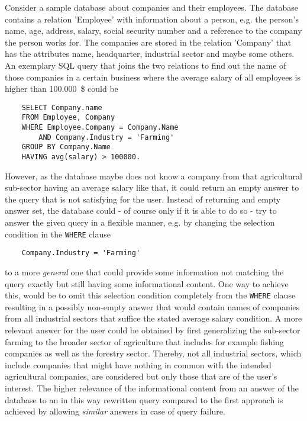 \begin{exmp}
\label{sec:intro_exmp}
Consider a sample database about companies and their employees. The database contains a relation 'Employee' with information about a person, e.g. the
person's name, age, address, salary, social security number and a reference to the company the person works for. The companies are stored in the
relation 'Company' that has the attributes name, headquarter, industrial sector and maybe some others. An exemplary SQL query that joins the two relations
to find out the name of those companies in a certain business where the average salary of all employees is higher than 100.000~\$ could be
\begin{verbatim}
    SELECT Company.name 
    FROM Employee, Company 
    WHERE Employee.Company = Company.Name 
        AND Company.Industry = 'Farming'
    GROUP BY Company.Name 
    HAVING avg(salary) > 100000.
\end{verbatim}
However, as the database maybe does not know a company from that agricultural sub-sector having an average salary like that, it could return an empty 
answer to the query that is not satisfying for the user. Instead of returning and empty answer set, the database could - of course only if it is able 
to do so - try to answer the given query in a flexible manner, e.g. by changing the selection condition in the \verb!WHERE! clause
\begin{verbatim}
    Company.Industry = 'Farming'
\end{verbatim}
to a more \emph{general} one that could provide some information not matching the query exactly but still having some informational content. One way to 
achieve this, would be to omit this selection condition completely from the \verb!WHERE! clause resulting in a possibly non-empty answer that would 
contain names of companies from all industrial sectors that suffice the stated average salary condition. A more relevant answer for the user could be
obtained by first generalizing the sub-sector farming to the broader sector of agriculture that includes for example fishing companies as well as the
forestry sector. Thereby, not all industrial sectors, which include companies that might have nothing in common with the intended agricultural companies,
are considered but only those that are of the user's interest. The higher relevance of the informational content from an answer of the database to an in 
this way rewritten query compared to the first approach is achieved by allowing \emph{similar} answers in case of query failure.
\end{exmp}

